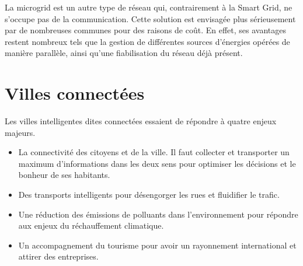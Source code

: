 
La microgrid est un autre type de réseau qui, contrairement à la Smart Grid, ne s'occupe pas de la communication.
Cette solution est envisagée plus sérieusement par de nombreuses communes pour des raisons de coût. En effet, ses
avantages restent nombreux tels que la gestion de différentes sources d'énergies opérées de manière parallèle,
ainsi qu'une fiabilisation du réseau déjà présent.




\section{Villes connectées}

Les villes intelligentes dites connectées essaient de répondre à quatre enjeux majeurs.
\begin{itemize}
    \item La connectivité des citoyens et de la ville. Il faut collecter et transporter un maximum d'informations dans les
deux sens pour optimiser les décisions et le bonheur de ses habitants.
    \item Des transports intelligents pour désengorger les rues et fluidifier le trafic.
    \item Une réduction des émissions de polluants dans l'environnement pour répondre aux enjeux du
réchauffement climatique.
    \item Un accompagnement du tourisme pour avoir un rayonnement international et attirer des entreprises.
\end{itemize}

